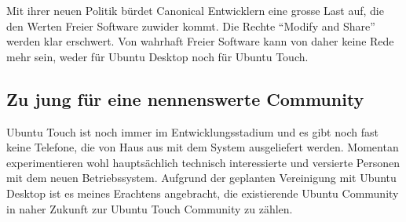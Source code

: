 Mit ihrer neuen Politik bürdet Canonical Entwicklern eine grosse Last auf, die den Werten Freier Software zuwider kommt. Die Rechte ``Modify and Share'' werden klar erschwert\thinspace\cite{online:ubuntutouch-mjgLicense}. Von wahrhaft Freier Software kann von daher keine Rede mehr sein, weder für Ubuntu Desktop noch für Ubuntu Touch.
\newline

\subsection{Zu jung für eine nennenswerte Community}
Ubuntu Touch ist noch immer im Entwicklungsstadium und es gibt noch fast keine Telefone, die von Haus aus mit dem System ausgeliefert werden\thinspace\cite{online:ubuntutouch-wikipedia}. Momentan experimentieren wohl hauptsächlich technisch interessierte und versierte Personen mit dem neuen Betriebssystem. Aufgrund der geplanten Vereinigung mit Ubuntu Desktop ist es meines Erachtens angebracht, die existierende Ubuntu Community in naher Zukunft zur Ubuntu Touch Community zu zählen.